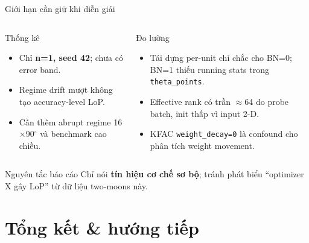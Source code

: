 \documentclass[8pt,aspectratio=169]{beamer}
\newcommand{\hl}[1]{\textcolor{accent}{\textbf{#1}}}
\begin{document}
\begin{frame}{Giới hạn cần giữ khi diễn giải}
\begin{columns}[T]
\begin{alertblock}{Thống kê}
\begin{itemize}\small
\item Chỉ \hl{n=1, seed 42}; chưa có error band.
\item Regime drift mượt không tạo accuracy-level LoP.
\item Cần thêm abrupt regime 16$\times$90$^\circ$ và benchmark cao chiều.
\end{itemize}
\end{alertblock}

\begin{alertblock}{Đo lường}
\begin{itemize}\small
\item Tái dựng per-unit chỉ chắc cho BN=0; BN=1 thiếu running stats trong \texttt{theta\_points}.
\item Effective rank có trần $\approx$64 do probe batch, init thấp vì input 2-D.
\item KFAC \texttt{weight\_decay=0} là confound cho phân tích weight movement.
\end{itemize}
\end{alertblock}
\end{columns}

\begin{exampleblock}{Nguyên tắc báo cáo}
Chỉ nói \textbf{tín hiệu cơ chế sơ bộ}; tránh phát biểu ``optimizer X gây LoP'' từ dữ liệu two-moons này.
\end{exampleblock}
\end{frame}

\section{Tổng kết \& hướng tiếp}
\end{document}
